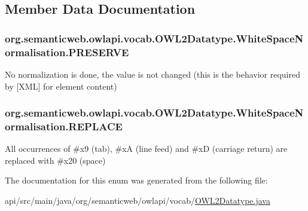\subsection{Member Data Documentation}
\hypertarget{enumorg_1_1semanticweb_1_1owlapi_1_1vocab_1_1_o_w_l2_datatype_1_1_white_space_normalisation_abbace752dad14a0f75ae60a120b5b83f}{
\subsubsection[{P\-R\-E\-S\-E\-R\-V\-E}]{\setlength{\rightskip}{0pt plus 5cm}org.\-semanticweb.\-owlapi.\-vocab.\-O\-W\-L2\-Datatype.\-White\-Space\-Normalisation.\-P\-R\-E\-S\-E\-R\-V\-E}}\label{enumorg_1_1semanticweb_1_1owlapi_1_1vocab_1_1_o_w_l2_datatype_1_1_white_space_normalisation_abbace752dad14a0f75ae60a120b5b83f}
No normalization is done, the value is not changed (this is the behavior required by \mbox{[}X\-M\-L\mbox{]} for element content) \hypertarget{enumorg_1_1semanticweb_1_1owlapi_1_1vocab_1_1_o_w_l2_datatype_1_1_white_space_normalisation_ad670006678747d8130829a55dbcf022d}{
\subsubsection[{R\-E\-P\-L\-A\-C\-E}]{\setlength{\rightskip}{0pt plus 5cm}org.\-semanticweb.\-owlapi.\-vocab.\-O\-W\-L2\-Datatype.\-White\-Space\-Normalisation.\-R\-E\-P\-L\-A\-C\-E}}\label{enumorg_1_1semanticweb_1_1owlapi_1_1vocab_1_1_o_w_l2_datatype_1_1_white_space_normalisation_ad670006678747d8130829a55dbcf022d}
All occurrences of \#x9 (tab), \#x\-A (line feed) and \#x\-D (carriage return) are replaced with \#x20 (space) 

The documentation for this enum was generated from the following file\-:\begin{DoxyCompactItemize}
\item 
api/src/main/java/org/semanticweb/owlapi/vocab/\hyperlink{_o_w_l2_datatype_8java}{O\-W\-L2\-Datatype.\-java}\end{DoxyCompactItemize}
